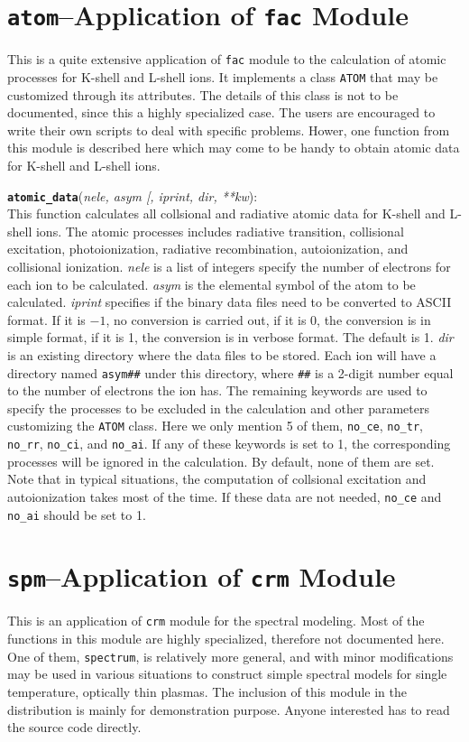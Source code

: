 \documentclass[twoside,letterpaper]{refrep}
\newcommand{\opt}[1]{
  {\textnormal{[}}{#1}\hspace{0.5mm}{\textnormal{]}}}
\newcommand{\var}[1]{\textit{#1}}
\newcommand{\key}[1]{\texttt{#1}}
\newcommand{\mod}[1]{\texttt{#1}}
\newenvironment{fundesc}[2]{
	\begin{center}
	\begin{minipage}{\textwidth}
	\index{#1}
	\addcontentsline{toc}{subsubsection}{#1}
	\key{\textbf{#1}}(\var{#2}):\\}
	{\end{minipage}\end{center}}
\begin{document}
\section{\mod{atom}--Application of \mod{fac} Module}
\label{sec:atom}
This is a quite extensive application of \mod{fac} module to the
calculation of atomic processes for K-shell and L-shell ions. It implements a
class \key{ATOM} that may be customized through its attributes. The details of
this class is not to be documented, since this a highly specialized case. The
users are encouraged to write their own scripts to deal with specific
problems. Hower, one function from this module is described here which may
come to be handy to obtain atomic data for K-shell and L-shell ions.
\begin{fundesc}{atomic\_data}{nele, asym\opt{, iprint, dir, \textnormal{**}kw}}
This function calculates all collsional and radiative atomic data for K-shell
and L-shell ions. The atomic processes includes radiative transition,
collisional excitation, photoionization, radiative recombination,
autoionization, and collisional ionization. \var{nele} is a list of integers
specify the number of electrons for each ion to be calculated. \var{asym} is
the elemental symbol of the atom to be calculated. \var{iprint} specifies if
the binary data files need to be converted to ASCII format. If it is $-1$, no
conversion is carried out, if it is 0, the conversion is in simple format,
if it is 1, the conversion is in verbose format. The default is 1. \var{dir}
is an existing directory where the data files to be stored. Each ion will have
a directory named \key{asym\#\#} under this directory, where \key{\#\#} is a
2-digit number equal to the number of electrons the ion has. The remaining
keywords are used to specify the processes to be excluded in the calculation
and other parameters customizing the \key{ATOM} class. Here we only mention 5
of them, \key{no\_ce}, \key{no\_tr}, \key{no\_rr}, \key{no\_ci}, and
\key{no\_ai}. If any of these keywords is set to 1, the corresponding processes
will be ignored in the calculation. By default, none of them are set. Note
that in typical situations, the computation of collsional excitation and
autoionization takes most of the time. If these data are not needed,
\key{no\_ce} and \key{no\_ai} should be set to 1.
\end{fundesc}

\section{\mod{spm}--Application of \mod{crm} Module}
\label{sec:spm}
This is an application of \mod{crm} module for the spectral modeling. Most of
the functions in this module are highly specialized, therefore not documented
here. One of them, \key{spectrum}, is relatively more general, and with minor
modifications may be used in various situations to construct simple spectral
models for single temperature, optically thin plasmas. The inclusion of this
module in the distribution is mainly for demonstration purpose. Anyone
interested has to read the source code directly.
\end{document}
